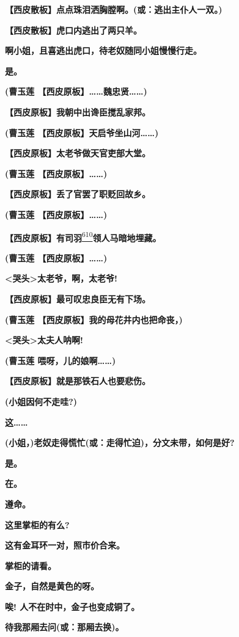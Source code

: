 \textbf{【西皮散板】点点珠泪洒胸膛啊。(或：逃出主仆人一双。)}

\textbf{【西皮散板】虎口内逃出了两只羊。}

\textbf{啊小姐，且喜逃出虎口，待老奴随同小姐慢慢行走。}

\textbf{是。}

\textbf{(曹玉莲 【西皮原板】\ldots{}\ldots{}魏忠贤\ldots{}\ldots{})}

\textbf{【西皮原板】我朝中出谗臣搅乱家邦。}

\textbf{(曹玉莲 【西皮原板】天启爷坐山河\ldots{}\ldots{})}

\textbf{【西皮原板】太老爷做天官吏部大堂。}

\textbf{(曹玉莲 【西皮原板】\ldots{}\ldots{})}

\textbf{【西皮原板】丢了官罢了职贬回故乡。}

\textbf{(曹玉莲 【西皮原板】\ldots{}\ldots{})}

\textbf{【西皮原板】有司羽}\protect\hyperlink{fn610}{\textsuperscript{610}}\textbf{领人马暗地埋藏。}

\textbf{(曹玉莲 【西皮原板】\ldots{}\ldots{})}

\textbf{\textless{}哭头\textgreater{}太老爷，啊，太老爷!}

\textbf{【西皮原板】最可叹忠良臣无有下场。}

\textbf{(曹玉莲 【西皮原板】我的母花井内也把命丧，)}

\textbf{\textless{}哭头\textgreater{}太夫人呐啊!}

\textbf{(曹玉莲 喂呀，儿的娘啊\ldots{}\ldots{})}

\textbf{【西皮原板】就是那铁石人也要悲伤。}

\textbf{(小姐因何不走哇?)}

\textbf{这\ldots{}\ldots{}}

\textbf{(小姐，)老奴走得慌忙(或：走得忙迫)，分文未带，如何是好?}

\textbf{是。}

\textbf{在。}

\textbf{遵命。}

\textbf{这里掌柜的有么?}

\textbf{这有金耳环一对，照市价合来。}

\textbf{掌柜的请看。}

\textbf{金子，自然是黄色的呀。}

\textbf{唉! 人不在时中，金子也变成铜了。}

\textbf{待我那厢去问(或：那厢去换)。}

